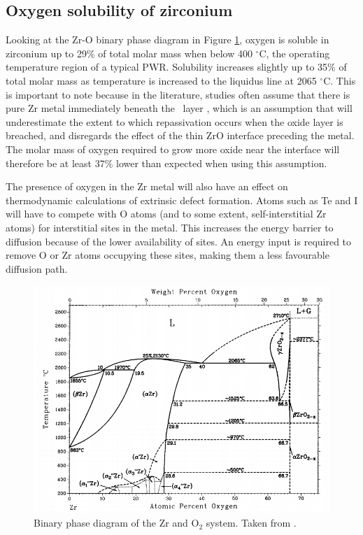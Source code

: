 \subsection{Oxygen solubility of zirconium}

Looking at the Zr-O binary phase diagram in Figure \ref{figure:binary_phase_diagram}, oxygen is soluble in zirconium up to 29\% of total molar mass when below 400 $^{\circ}$C, the operating temperature region of a typical PWR. Solubility increases slightly up to 35\% of total molar mass as temperature is increased to the liquidus line at 2065 $^{\circ}$C. This is important to note because in the literature, studies often assume that there is pure Zr metal immediately beneath the \zirconia\ layer \cite{rossi2015first}, which is an assumption that will underestimate the extent to which repassivation occurs when the oxide layer is breached, and disregards the effect of the thin ZrO interface preceding the metal. The molar mass of oxygen required to grow more oxide near the interface will therefore be at least 37\% lower than expected when using this assumption.

The presence of oxygen in the Zr metal will also have an effect on thermodynamic calculations of extrinsic defect formation. Atoms such as Te and I will have to compete with O atoms (and to some extent, self-interstitial Zr atoms) for interstitial sites in the metal. This increases the energy barrier to diffusion because of the lower availability of sites. An energy input is required to remove O or Zr atoms occupying these sites, making them a less favourable diffusion path.


\begin{figure}[htp]
\centering
\includegraphics[width=14cm]{images/zro2_binary_phase.png}
\caption[Binary phase diagram of the Zr and O$_{2}$ system.]{Binary phase diagram of the Zr and O$_{2}$ system. Taken from \cite{Abriata1986}.}
\label{figure:binary_phase_diagram}
\end{figure}

